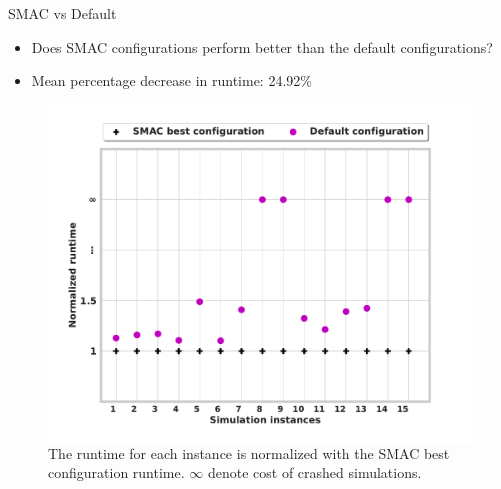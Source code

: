 \documentclass[10pt]{beamer}
\begin{document}
\begin{frame}[t]{SMAC vs Default}
\begin{itemize}
    \item Does SMAC configurations perform better than the default configurations?
    \newline
    \item Mean percentage decrease in runtime: 24.92\%
    \end{itemize}
\begin{figure}
  \begin{columns}
    \includegraphics[width=\linewidth, height=0.58\textheight]{images/SMAC_vs_default.pdf}
    \caption{The runtime for each instance is normalized with the SMAC best configuration runtime. $\infty$ denote cost of crashed simulations.}
  \end{columns}
\end{figure}
\end{frame}
\end{document}
